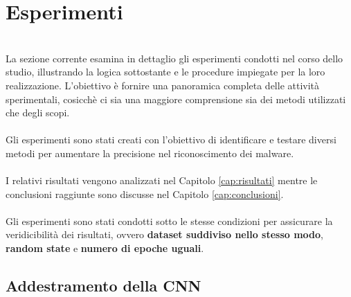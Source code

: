 \section{Esperimenti}
~\\
\indent La sezione corrente esamina in dettaglio gli esperimenti condotti nel corso dello studio, illustrando la logica sottostante e le procedure impiegate per la loro realizzazione. 
L'obiettivo è fornire una panoramica completa delle attività sperimentali, cosicchè ci sia una maggiore comprensione sia dei metodi utilizzati che degli scopi.
\\\\
Gli esperimenti sono stati creati con l'obiettivo di identificare e testare diversi metodi per aumentare la precisione nel riconoscimento dei malware.
\\\\
I relativi risultati vengono analizzati nel Capitolo \ref{cap:risultati} mentre le conclusioni raggiunte sono discusse nel Capitolo \ref{cap:conclusioni}.
\\\\
Gli esperimenti sono stati condotti sotto le stesse condizioni per assicurare la veridicibilità dei risultati, ovvero \textbf{dataset suddiviso nello stesso modo}, \textbf{random state} e \textbf{numero di epoche uguali}. 


\subsection{Addestramento della CNN}
